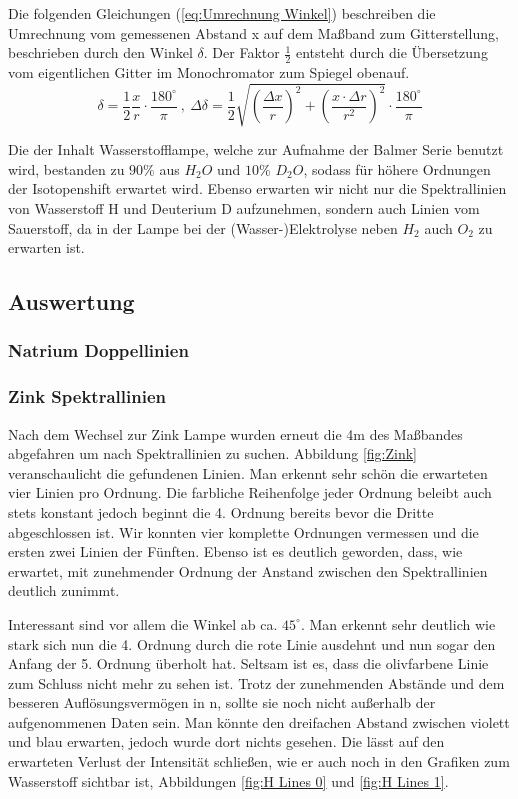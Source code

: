 \documentclass[]{article}
\begin{document}
Die folgenden Gleichungen (\ref{eq:Umrechnung Winkel}) beschreiben die Umrechnung vom gemessenen Abstand x auf dem Maßband zum Gitterstellung, beschrieben durch den Winkel $\delta$. Der Faktor $\frac{1}{2}$ entsteht durch die Übersetzung vom eigentlichen Gitter im Monochromator zum Spiegel obenauf.
\begin{equation}\label{eq:Umrechnung Winkel}
\delta= \frac{1}{2}\frac{x}{r} \cdot \frac{180^\circ}{\pi} \:,\: \Delta\delta= \frac{1}{2} \sqrt{\left(\frac{\Delta x}{r}\right)^2 + \left(\frac{x\cdot \Delta r}{r^2}\right)^2} \cdot \frac{180^\circ}{\pi}
\end{equation}

Die der Inhalt Wasserstofflampe, welche zur Aufnahme der Balmer Serie benutzt wird, bestanden zu $90\%$ aus $H_2O$ und $10\%$ $D_2O$, sodass für höhere Ordnungen der Isotopenshift erwartet wird. Ebenso erwarten wir nicht nur die Spektrallinien von Wasserstoff H und Deuterium D aufzunehmen, sondern auch Linien vom Sauerstoff, da in der Lampe bei der (Wasser-)Elektrolyse neben $H_2$ auch $O_2$ zu erwarten ist.


\subsection{Auswertung}
\subsubsection{Natrium Doppellinien}

\subsubsection{Zink Spektrallinien}
Nach dem Wechsel zur Zink Lampe wurden erneut die 4m des Maßbandes abgefahren um nach Spektrallinien zu suchen. Abbildung \ref{fig:Zink} veranschaulicht die gefundenen Linien. Man erkennt sehr schön die erwarteten vier Linien pro Ordnung. Die farbliche Reihenfolge jeder Ordnung beleibt auch stets konstant jedoch beginnt die 4. Ordnung bereits bevor die Dritte abgeschlossen ist. Wir konnten vier komplette Ordnungen vermessen und die ersten zwei Linien der Fünften. Ebenso ist es deutlich geworden, dass, wie erwartet, mit zunehmender Ordnung der Anstand zwischen den Spektrallinien deutlich zunimmt. 

Interessant sind vor allem die Winkel ab ca. $45^\circ$. Man erkennt sehr deutlich wie stark sich nun die 4. Ordnung durch die rote Linie ausdehnt und nun sogar den Anfang der 5. Ordnung überholt hat. Seltsam ist es, dass die olivfarbene Linie zum Schluss nicht mehr zu sehen ist. Trotz der zunehmenden Abstände und dem besseren Auflösungsvermögen in n, sollte sie noch nicht außerhalb der aufgenommenen Daten sein. Man könnte den dreifachen Abstand zwischen violett und blau erwarten, jedoch wurde dort nichts gesehen. Die lässt auf den erwarteten Verlust der Intensität schließen, wie er auch noch in den Grafiken zum Wasserstoff sichtbar ist, Abbildungen \ref{fig:H Lines 0} und \ref{fig:H Lines 1}.
\end{document}

